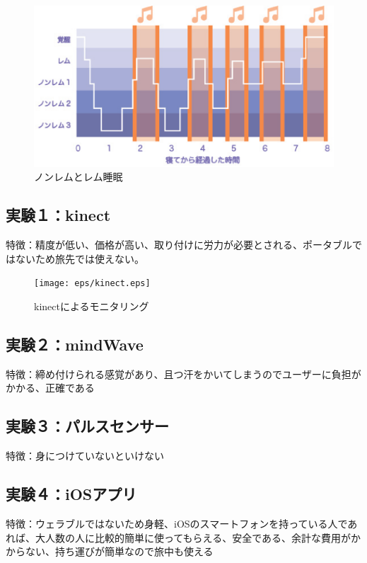 \begin{figure}[htbp]
\begin{center}
\includegraphics[width=15cm]{eps/remNonrem.eps}
\caption{ノンレムとレム睡眠}
\label{ノンレムとレム睡眠}
\end{center}
\end{figure}

\subsection{実験１：kinect}
特徴：精度が低い、価格が高い、取り付けに労力が必要とされる、ポータブルではないため旅先では使えない。
\begin{figure}[htbp]
\begin{center}
\texttt{[image: eps/kinect.eps]}
\caption{kinectによるモニタリング}
\label{kinectによるモニタリング}
\end{center}
\end{figure}

\subsection{実験２：mindWave}
特徴：締め付けられる感覚があり、且つ汗をかいてしまうのでユーザーに負担がかかる、正確である
\subsection{実験３：パルスセンサー}
特徴：身につけていないといけない
\subsection{実験４：iOSアプリ}
特徴：ウェラブルではないため身軽、iOSのスマートフォンを持っている人であれば、大人数の人に比較的簡単に使ってもらえる、安全である、余計な費用がかからない、持ち運びが簡単なので旅中も使える
